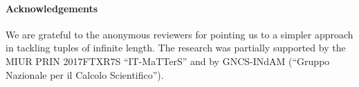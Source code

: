 \documentclass[a4paper]{elsarticle}
\newcommand{\1}{\mathbf{1}}
\def\odiv{{ \ominus\hspace{-8pt}:}\;}
\begin{document}


\paragraph*{Acknowledgements}
We are grateful to the anonymous reviewers for pointing us to a simpler approach in tackling tuples of infinite length. 
The research was partially supported by the MIUR PRIN 2017FTXR7S ``IT-MaTTerS'' and by GNCS-INdAM (``Gruppo Nazionale per il Calcolo Scientifico'').

%
%

%



\end{document}
